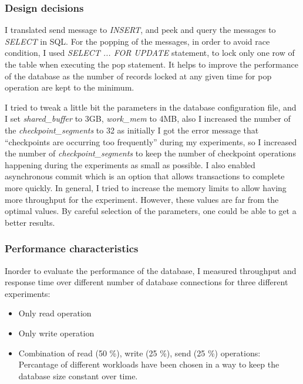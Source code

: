 \documentclass[11pt]{article}
\begin{document}
\subsubsection{Design decisions}\label{sec:design-decisions}
I translated send message to \emph{INSERT}, and peek and query the messages
to \emph{SELECT} in SQL. For the popping of the messages, in order to avoid race
condition, I used \emph{SELECT ... FOR UPDATE} statement, to lock only one 
row of the table when executing the pop statement. It helps to improve the performance
of the database as the number of records locked at any given time for pop 
operation are kept to the minimum.

I tried to tweak a little bit the parameters in the database configuration file, and I set 
\emph{shared\_buffer} to 3GB, \emph{work\_mem} to 4MB, also I increased 
the number of the \emph{checkpoint\_segments} to 32 as initially I got the 
error message that ``checkpoints are occurring too frequently'' during my 
experiments, so I increased the number of \emph{checkpoint\_segments} to keep
the number of checkpoint operations happening during the experiments as small as 
possible. I also enabled asynchronous commit which is an option that allows 
transactions to complete more quickly. In general, I tried to increase the 
memory limits to allow having more throughput for the experiment. However, these values 
are far from the optimal values. By careful selection of the parameters, one could
be able to get a better results.

\subsubsection{Performance characteristics}\label{sec:performance-characteristics}
Inorder to evaluate the performance of the database, I measured throughput and 
response time over different number of database connections for three different experiments:
\begin{itemize}
 \item Only read operation
 \item Only write operation
 \item Combination of read (50 \%), write (25 \%), send (25 \%) operations: Percantage of different
 workloads have been chosen in a way to keep the database size constant over time.
\end{itemize}
\end{document}
